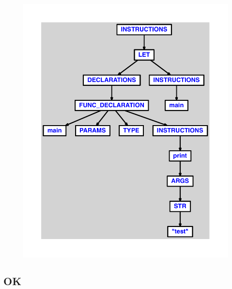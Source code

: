 \documentclass{article}
\begin{document}
\begin{figure}[H]\centering\includegraphics[max width=\textwidth]{ast/ast_220.pdf}\end{figure}\subsection{OK}
\end{document}
